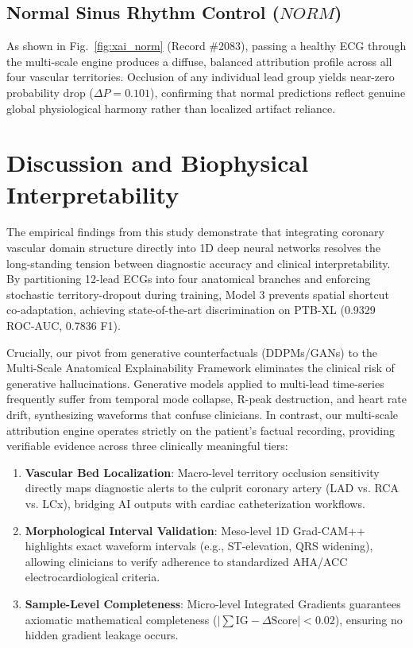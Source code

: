 \documentclass[12pt]{elsarticle}
\begin{document}
\subsection{Normal Sinus Rhythm Control ($NORM$)}
As shown in Fig.~\ref{fig:xai_norm} (Record \#2083), passing a healthy ECG through the multi-scale engine produces a diffuse, balanced attribution profile across all four vascular territories. Occlusion of any individual lead group yields near-zero probability drop ($\Delta P = 0.101$), confirming that normal predictions reflect genuine global physiological harmony rather than localized artifact reliance.

\section{Discussion and Biophysical Interpretability}
\label{sec:discussion}

The empirical findings from this study demonstrate that integrating coronary vascular domain structure directly into 1D deep neural networks resolves the long-standing tension between diagnostic accuracy and clinical interpretability. By partitioning 12-lead ECGs into four anatomical branches and enforcing stochastic territory-dropout during training, Model 3 prevents spatial shortcut co-adaptation, achieving state-of-the-art discrimination on PTB-XL (0.9329 ROC-AUC, 0.7836 F1).

Crucially, our pivot from generative counterfactuals (DDPMs/GANs) to the Multi-Scale Anatomical Explainability Framework eliminates the clinical risk of generative hallucinations. Generative models applied to multi-lead time-series frequently suffer from temporal mode collapse, R-peak destruction, and heart rate drift, synthesizing waveforms that confuse clinicians. In contrast, our multi-scale attribution engine operates strictly on the patient's factual recording, providing verifiable evidence across three clinically meaningful tiers:
\begin{enumerate}
    \item \textbf{Vascular Bed Localization}: Macro-level territory occlusion sensitivity directly maps diagnostic alerts to the culprit coronary artery (LAD vs. RCA vs. LCx), bridging AI outputs with cardiac catheterization workflows.
    \item \textbf{Morphological Interval Validation}: Meso-level 1D Grad-CAM++ highlights exact waveform intervals (e.g., ST-elevation, QRS widening), allowing clinicians to verify adherence to standardized AHA/ACC electrocardiological criteria.
    \item \textbf{Sample-Level Completeness}: Micro-level Integrated Gradients guarantees axiomatic mathematical completeness ($|\sum \text{IG} - \Delta \text{Score}| < 0.02$), ensuring no hidden gradient leakage occurs.
\end{enumerate}
\end{document}
